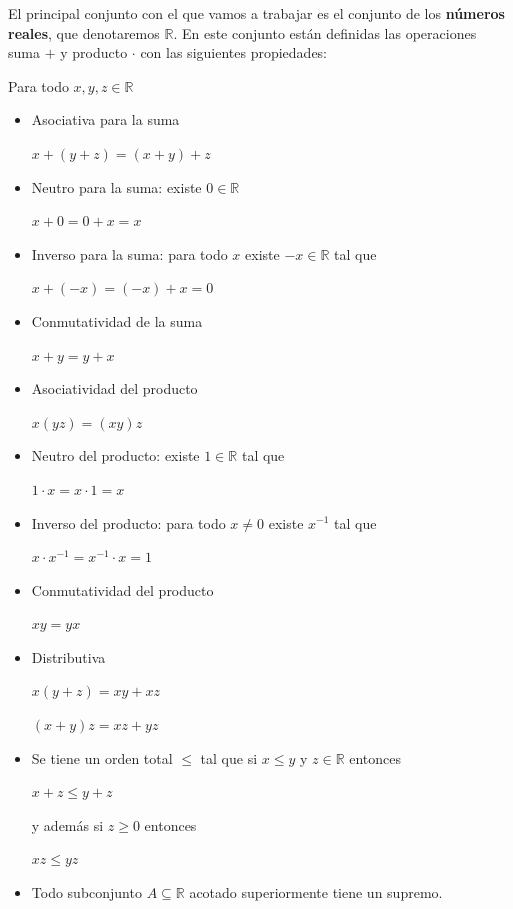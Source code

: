 \begin{definition} 
El principal conjunto con el que vamos a trabajar es el conjunto de los \textbf{números reales}, que denotaremos $\mathbb{R}$.  En este conjunto están definidas las operaciones suma $+$ y producto $\cdot$ con las siguientes propiedades:

Para todo $x,y,z \in \mathbb{R}$

\begin{itemize}

\item Asociativa para la suma

$x+(y+z) = (x+y)+z$

\item Neutro para la suma: existe $0 \in \mathbb{R}$

$x+0 = 0+x = x$

\item Inverso para la suma: para todo $x$ existe $-x \in \mathbb{R}$ tal que

$x + (-x) = (-x) + x = 0$

\item Conmutatividad de la suma

$x+y = y+x$

\item Asociatividad del producto

$x(yz) = (xy)z$

\item Neutro del producto: existe $1 \in \mathbb{R}$ tal que

$1 \cdot x = x \cdot 1 = x$

\item Inverso del producto: para todo $x \neq 0$ existe $x^{-1}$ tal que

$x \cdot x^{-1} = x^{-1} \cdot x = 1$

\item Conmutatividad del producto

$xy = yx$

\item Distributiva

$x(y+z) = xy + xz$

$(x+y)z = xz + yz$

\item Se tiene un orden total $\leq$ tal que si $x \leq y$ y $z \in \mathbb{R}$ entonces

$x+z \leq y+z$

y además si $z \geq 0$ entonces

$xz \leq yz$ 

\item Todo subconjunto $A \subseteq \mathbb{R}$ acotado superiormente tiene un supremo.

\end{itemize}
\end{definition}

